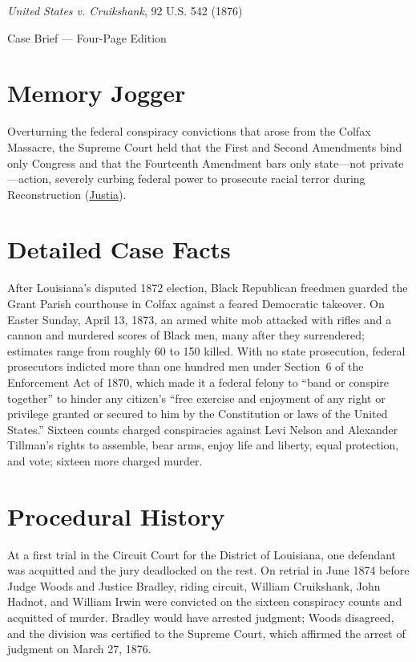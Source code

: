 \documentclass[12pt]{article}
\begin{document}
\begin{center}
{\LARGE \textit{United States v. Cruikshank}, 92 U.S. 542 (1876)\par}
\vspace{0.8em}
{\large Case Brief --- Four-Page Edition\par}
\end{center}
\vspace{1em}

\section{Memory Jogger}

Overturning the federal conspiracy convictions that arose from the Colfax Massacre, the Supreme Court held that the First and Second Amendments bind only Congress and that the Fourteenth Amendment bars only state---not private---action, severely curbing federal power to prosecute racial terror during Reconstruction (\href{https://supreme.justia.com/cases/federal/us/92/542/}{Justia}).

\section{Detailed Case Facts}

After Louisiana's disputed 1872 election, Black Republican freedmen guarded the Grant Parish courthouse in Colfax against a feared Democratic takeover. On Easter Sunday, April 13, 1873, an armed white mob attacked with rifles and a cannon and murdered scores of Black men, many after they surrendered; estimates range from roughly 60 to 150 killed. With no state prosecution, federal prosecutors indicted more than one hundred men under Section~6 of the Enforcement Act of 1870, which made it a federal felony to ``band or conspire together'' to hinder any citizen's ``free exercise and enjoyment of any right or privilege granted or secured to him by the Constitution or laws of the United States.'' Sixteen counts charged conspiracies against Levi Nelson and Alexander Tillman's rights to assemble, bear arms, enjoy life and liberty, equal protection, and vote; sixteen more charged murder.

\section{Procedural History}

At a first trial in the Circuit Court for the District of Louisiana, one defendant was acquitted and the jury deadlocked on the rest. On retrial in June 1874 before Judge Woods and Justice Bradley, riding circuit, William Cruikshank, John Hadnot, and William Irwin were convicted on the sixteen conspiracy counts and acquitted of murder. Bradley would have arrested judgment; Woods disagreed, and the division was certified to the Supreme Court, which affirmed the arrest of judgment on March 27, 1876.
\end{document}

